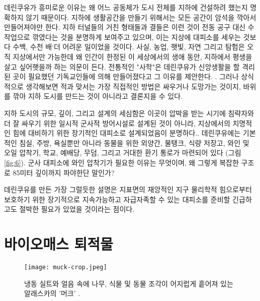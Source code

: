 \documentclass[10pt,twocolumn,letterpaper]{article}
\begin{document}
데린쿠유가 흥미로운 이유는 왜 어느 공동체가 도시 전체를 지하에 건설하려 했는지 명확하지 않기 때문이다. 지하에 생활공간을 만들기 위해서는 모든 공간이 암석을 깍아서 만들어져야만 한다. 지하 터널들의 거친 형태들과 결들은 이런 것이 전동 공구 대신 수작업으로 깎였다는 것을 분명하게 보여주고 있으며, 이는 지상에 대피소를 세우는 것보다 수백, 수천 배`더 어려운 일이었을 것이다. 사실, 농업, 햇빛, 자연 그리고 탐험은 오직 지상에서만  가능한데 왜 인간이 한정된 이 세상에서의 생애 동안, 지하에서 평생을 살고 싶어햇을까 하는 의문이 든다. 전통적인 "사학"은 데린쿠유가 신앙생활을 할 격리된 곳이 필요했던 기독교인들에 의해 만들어졌다고 그 이유를 제안한다. \cite{53}. 그러나 상식적으로 생각해보면 적과 맞서는 가장 직접적인 방법은  싸우거나 도망가는 것이지, 바위를 깎아 지하 도시를 만드는 것이 아니라고 결론지을 수 있다.

지하 도시의 규모, 깊이, 그리고 설계의 세심함은 이곳이 압박을 받는 시기에
 침략자와 더 잘 싸우기 위한 일시적 군사적 방어시설로 설계된 것이 아니라, 지상에서의 치명적인 힘에 대비하기 위한 장기적인 대피소로 설계되었음이 분명하다.. 데린쿠유에는 기본적인 침실, 주방, 욕실뿐만 아니라 동물을 위한 외양간, 물탱크, 식량 저장고, 와인 및 오일 압착기, 학교, 예배당, 무덤, 그리고 거대한 환기 통로가 마련되어 있다 (그림 \ref{fig:6}). 군사 대피소에 와인 압착기가 필요한 이유는 무엇이며, 왜 그렇게 복잡한 구조로 85미터 깊이까지 파야한단 말인가?

데린쿠유를 만든 가장 그럴듯한 설명은 지표면의 재앙적인 지구 물리학적 힘으로부터 보호하기 위한 장기적으로 지속가능하고 자급자족할 수 있는 대피소를 준비할 긴급하고도 절박한 필요가 있었을 것이라는 점이다.

\section{바이오매스 퇴적물}

\begin{figure}[b]
\begin{center}
   \texttt{[image: muck-crop.jpeg]}
\end{center}
   \caption{ 냉동 실트와 얼음 속에 나무, 식물 및 동물 조각이 어지럽게 흩어져 있는 알래스카의 '머크' \cite{146}.}
\label{fig:7}
\label{fig:onecol}
\end{figure}
 
\end{document}

